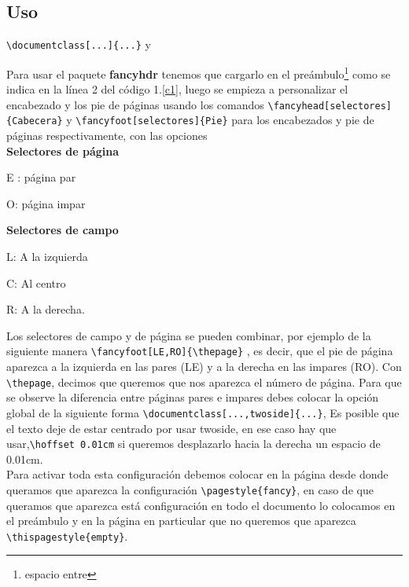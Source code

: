 \subsection{Uso}
\begin{lrbox}{\LstBox}
\lstinline+\documentclass[...]{...}+ y \lstinline++
\end{lrbox}
Para usar el paquete \textbf{fancyhdr} tenemos que cargarlo en el preámbulo\footnote{ espacio entre \usebox{\LstBox}   } como se indica en la línea 2 del código 1.\ref{c1}, luego se empieza a personalizar el encabezado y los pie de páginas usando los comandos  \lstinline+\fancyhead[selectores]{Cabecera}+ y  \lstinline+\fancyfoot[selectores]{Pie}+ para los encabezados y pie de páginas respectivamente, con las opciones\\
\textbf{ Selectores de página}
\begin{lista}
\item E : página par
\item O: página impar
\end{lista}
\textbf{Selectores de campo}
\begin{lista}
\item L: A la izquierda
\item C: Al centro
\item R: A la derecha.
\end{lista}
Los selectores de campo y de página se pueden combinar, por ejemplo de la siguiente manera \lstinline+\fancyfoot[LE,RO]{\thepage}+ , es decir, que el pie de página aparezca a la izquierda en las pares (LE) y a la derecha en las impares (RO). Con \lstinline+\thepage+, decimos que queremos que nos aparezca el número de página. Para que se observe la diferencia entre páginas pares e impares debes colocar la opción global de la siguiente forma \lstinline+\documentclass[...,twoside]{...}+, Es posible que el texto deje de estar centrado por usar twoside, en ese caso hay que usar,\lstinline+\hoffset 0.01cm+ si queremos desplazarlo hacia la derecha un espacio de 0.01cm.\\
Para activar toda esta configuración debemos colocar en la página desde donde queramos que aparezca la configuración \lstinline+\pagestyle{fancy}+, en caso de que queramos que aparezca está configuración en todo el documento lo colocamos en el preámbulo y en la página en particular que no queremos que aparezca \lstinline+\thispagestyle{empty}+.
